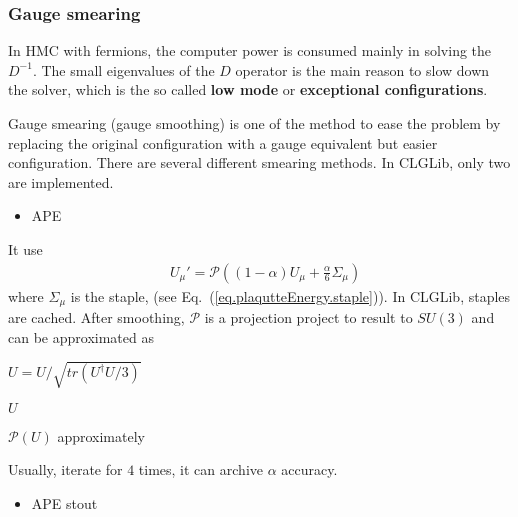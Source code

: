 \subsubsection{\label{Gauge_Smearing}Gauge smearing}

In HMC with fermions, the computer power is consumed mainly in solving the $D^{-1}$. The small eigenvalues of the $D$ operator is the main reason to slow down the solver, which is the so called \textbf{low mode} or \textbf{exceptional configurations}.

Gauge smearing (gauge smoothing) is one of the method to ease the problem by replacing the original configuration with a gauge equivalent but easier configuration. There are several different smearing methods. In CLGLib, only two are implemented.

\begin{itemize}
  \item {}APE
\end{itemize}

It use
\begin{equation}
\begin{split}
&U_{\mu}'=\mathcal{P}\left((1-\alpha)U_{\mu} + \frac{\alpha}{6}\Sigma _{\mu}\right)
\end{split}
\end{equation}
where $\Sigma _{\mu}$ is the staple, (see Eq.~(\ref{eq.plaqutteEnergy.staple})). In CLGLib, staples are cached. After smoothing, $\mathcal{P}$ is a projection project to result to $SU(3)$ and can be approximated as
\begin{algorithm}[H]
\begin{algorithmic}
\State $U =U / \sqrt{tr(U^{\dagger}U / 3)}$
\EndFor

\Return $U$
\end{algorithmic}
\caption{$\mathcal{P}(U)$ approximately}
\end{algorithm}

Usually, iterate for $4$ times, it can archive $\mathcal{\alpha}$ accuracy.

\begin{itemize}
  \item {}APE stout
\end{itemize}

